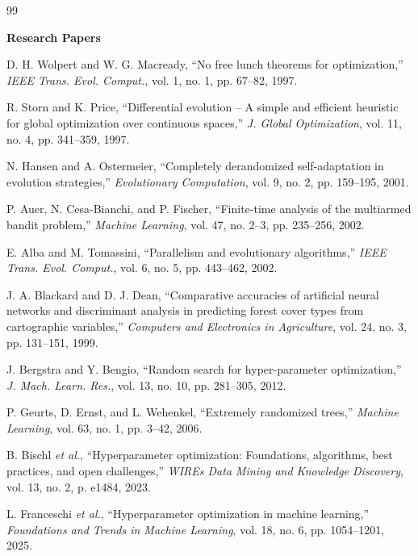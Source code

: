\documentclass[11pt, a4paper]{article}
\begin{document}
\vspace{0.2cm}
\begin{thebibliography}{99}
\small

\item[] \textbf{Research Papers}

 D. H. Wolpert and W. G. Macready, ``No free lunch theorems for optimization,'' \textit{IEEE Trans. Evol. Comput.}, vol. 1, no. 1, pp. 67--82, 1997.

 R. Storn and K. Price, ``Differential evolution -- A simple and efficient heuristic for global optimization over continuous spaces,'' \textit{J. Global Optimization}, vol. 11, no. 4, pp. 341--359, 1997.

 N. Hansen and A. Ostermeier, ``Completely derandomized self-adaptation in evolution strategies,'' \textit{Evolutionary Computation}, vol. 9, no. 2, pp. 159--195, 2001.

 P. Auer, N. Cesa-Bianchi, and P. Fischer, ``Finite-time analysis of the multiarmed bandit problem,'' \textit{Machine Learning}, vol. 47, no. 2--3, pp. 235--256, 2002.

 E. Alba and M. Tomassini, ``Parallelism and evolutionary algorithms,'' \textit{IEEE Trans. Evol. Comput.}, vol. 6, no. 5, pp. 443--462, 2002.

 J. A. Blackard and D. J. Dean, ``Comparative accuracies of artificial neural networks and discriminant analysis in predicting forest cover types from cartographic variables,'' \textit{Computers and Electronics in Agriculture}, vol. 24, no. 3, pp. 131--151, 1999.

 J. Bergstra and Y. Bengio, ``Random search for hyper-parameter optimization,'' \textit{J. Mach. Learn. Res.}, vol. 13, no. 10, pp. 281--305, 2012.

 P. Geurts, D. Ernst, and L. Wehenkel, ``Extremely randomized trees,'' \textit{Machine Learning}, vol. 63, no. 1, pp. 3--42, 2006.

 B. Bischl \textit{et al.}, ``Hyperparameter optimization: Foundations, algorithms, best practices, and open challenges,'' \textit{WIREs Data Mining and Knowledge Discovery}, vol. 13, no. 2, p. e1484, 2023.

 L. Franceschi \textit{et al.}, ``Hyperparameter optimization in machine learning,'' \textit{Foundations and Trends in Machine Learning}, vol. 18, no. 6, pp. 1054--1201, 2025.


\end{thebibliography}
\end{document}
